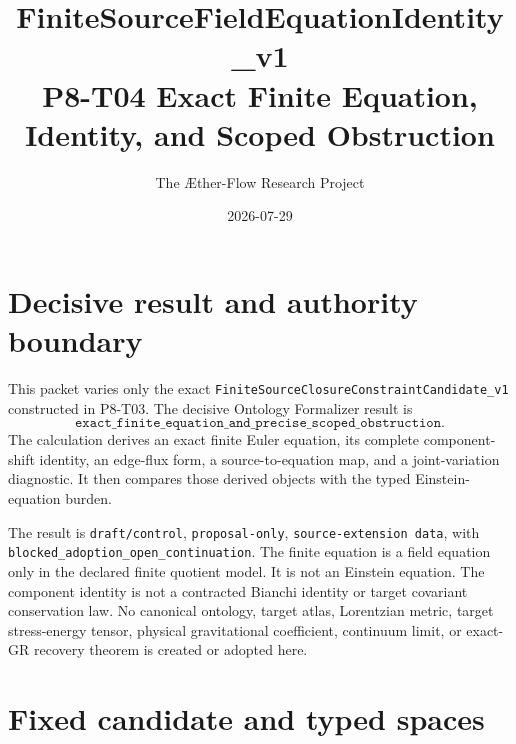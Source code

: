 \documentclass[11pt]{article}
\title{FiniteSourceFieldEquationIdentity\_v1\\
P8-T04 Exact Finite Equation, Identity, and Scoped Obstruction}
\author{The \AE ther-Flow Research Project}
\date{2026-07-29}
\begin{document}
\sloppy
\maketitle

\section{Decisive result and authority boundary}

This packet varies only the exact
\texttt{FiniteSourceClosureConstraintCandidate\_v1} constructed in P8-T03.
The decisive Ontology Formalizer result is
\[
 \texttt{exact\_finite\_equation\_and\_precise\_scoped\_obstruction}.
\]
The calculation derives an exact finite Euler equation, its complete
component-shift identity, an edge-flux form, a source-to-equation map, and a
joint-variation diagnostic.  It then compares those derived objects with the
typed Einstein-equation burden.

The result is \texttt{draft/control}, \texttt{proposal-only},
\texttt{source-extension data}, with
\texttt{blocked\_adoption\_open\_continuation}.  The finite equation is a
field equation only in the declared finite quotient model.  It is not an
Einstein equation.  The component identity is not a contracted Bianchi
identity or target covariant conservation law.  No canonical ontology,
target atlas, Lorentzian metric, target stress-energy tensor, physical
gravitational coefficient, continuum limit, or exact-GR recovery theorem is
created or adopted here.

\section{Fixed candidate and typed spaces}
\end{document}
